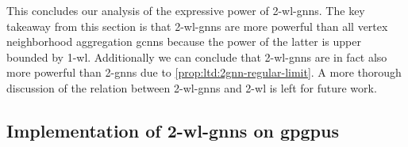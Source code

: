 This concludes our analysis of the expressive power of 2-\acs{wl}-\acsp{gnn}.
The key takeaway from this section is that 2-\acs{wl}-\acsp{gnn} are more powerful than all vertex neighborhood aggregation \acp{gcnn} because the power of the latter is upper bounded by 1-\acs{wl}.
Additionally we can conclude that 2-\acs{wl}-\acsp{gnn} are in fact also more powerful than 2-\acsp{gnn} due to \cref{prop:ltd:2gnn-regular-limit}.
A more thorough discussion of the relation between 2-\acs{wl}-\acsp{gnn} and 2-\acs{wl} is left for future work.

\subsection{Implementation of 2-\acs*{wl}-\acsp*{gnn} on \acsp*{gpgpu}}%
\label{sec:ltd:wl2gnn:implementation}
